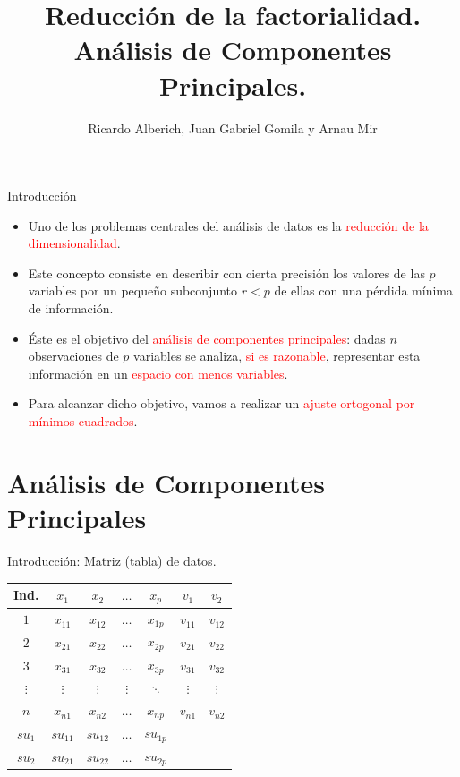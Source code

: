 \documentclass[
  ignorenonframetext,
]{beamer}
\title{Reducción de la factorialidad. Análisis de Componentes
Principales.}
\author{Ricardo Alberich, Juan Gabriel Gomila y Arnau Mir}
\date{}
\providecommand{\tightlist}{%
  \setlength{\itemsep}{0pt}\setlength{\parskip}{0pt}}
\newcommand\red[1]{\textcolor{red}{#1}}
\begin{document}
\frame{\titlepage}

\begin{frame}{Introducción}
\label{introducciuxf3n}
\begin{itemize}
\tightlist
\item
  Uno de los problemas centrales del análisis de datos es la
  \red{reducción de la dimensionalidad}.
\item
  Este concepto consiste en describir con cierta precisión los valores
  de las \(p\) variables por un pequeño subconjunto \(r<p\) de ellas con
  una pérdida mínima de información.
\item
  Éste es el objetivo del \red{análisis de componentes principales}:
  dadas \(n\) observaciones de \(p\) variables se analiza,
  \red{si es razonable}, representar esta información en un
  \red{espacio con menos variables}.
\item
  Para alcanzar dicho objetivo, vamos a realizar un
  \red{ajuste ortogonal por mínimos cuadrados}.
\end{itemize}
\end{frame}

\section{Análisis de Componentes
Principales}\label{anuxe1lisis-de-componentes-principales}

\begin{frame}{Introducción: Matriz (tabla) de datos.}
\label{introducciuxf3n-matriz-tabla-de-datos.}
\begin{table}
\centering
\begin{tabular}{c|cccc|cc|}
Ind. & $x_1$ & $x_2$ & $\ldots$ & $x_p$ & $v_1$ & $v_2$\\
\hline
$1$      & $x_{11}$ & $x_{12}$ & $\ldots$  & $x_{1p}$ & $v_{11}$ & $v_{12}$ \\
$2$      & $x_{21}$ & $x_{22}$ & $\ldots$  & $x_{2p}$ & $v_{21}$ & $v_{22}$ \\
$3$      & $x_{31}$ & $x_{32}$ & $\ldots$  & $x_{3p}$ & $v_{31}$ & $v_{32}$ \\
$\vdots$ & $\vdots$ & $\vdots$ & $\vdots$  & $\ddots$ & $\vdots$ & $\vdots$ \\
$n$      & $x_{n1}$ & $x_{n2}$ & $\ldots$  & $x_{np}$ & $v_{n1}$ & $v_{n2}$ \\
 \hline
$su_1$   &$su_{11}$ &$su_{12}$ & $\ldots$  &$su_{1p}$ &\multicolumn{2}{|c}{}\\
$su_2$   &$su_{21}$ &$su_{22}$ & $\ldots$  &$su_{2p}$ &\multicolumn{2}{|c}{}\\
\cline{1-5}
\end{tabular}
\end{table}
\end{frame}
\end{document}
